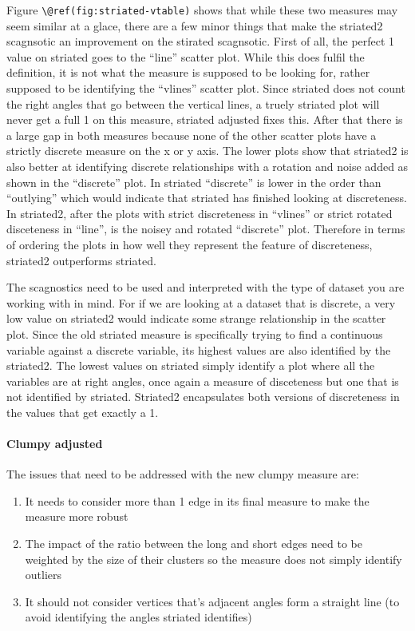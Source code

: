 Figure \texttt{\textbackslash{}@ref(fig:striated-vtable)} shows that
while these two measures may seem similar at a glace, there are a few
minor things that make the striated2 scagnsotic an improvement on the
stirated scagnsotic. First of all, the perfect 1 value on striated goes
to the ``line'' scatter plot. While this does fulfil the definition, it
is not what the measure is supposed to be looking for, rather supposed
to be identifying the ``vlines'' scatter plot. Since striated does not
count the right angles that go between the vertical lines, a truely
striated plot will never get a full 1 on this measure, striated adjusted
fixes this. After that there is a large gap in both measures because
none of the other scatter plots have a strictly discrete measure on the
x or y axis. The lower plots show that striated2 is also better at
identifying discrete relationships with a rotation and noise added as
shown in the ``discrete'' plot. In striated ``discrete'' is lower in the
order than ``outlying'' which would indicate that striated has finished
looking at discreteness. In striated2, after the plots with strict
discreteness in ``vlines'' or strict rotated disceteness in ``line'', is
the noisey and rotated ``discrete'' plot. Therefore in terms of ordering
the plots in how well they represent the feature of discreteness,
striated2 outperforms striated.

The scagnostics need to be used and interpreted with the type of dataset
you are working with in mind. For if we are looking at a dataset that is
discrete, a very low value on striated2 would indicate some strange
relationship in the scatter plot. Since the old striated measure is
specifically trying to find a continuous variable against a discrete
variable, its highest values are also identified by the striated2. The
lowest values on striated simply identify a plot where all the variables
are at right angles, once again a measure of disceteness but one that is
not identified by striated. Striated2 encapsulates both versions of
discreteness in the values that get exactly a 1.

\hypertarget{clumpy-adjusted}{%
\paragraph{Clumpy adjusted}\label{clumpy-adjusted}}

The issues that need to be addressed with the new clumpy measure are:

\begin{enumerate}
\def\labelenumi{\arabic{enumi}.}
\tightlist
\item
  It needs to consider more than 1 edge in its final measure to make the
  measure more robust
\item
  The impact of the ratio between the long and short edges need to be
  weighted by the size of their clusters so the measure does not simply
  identify outliers
\item
  It should not consider vertices that's adjacent angles form a straight
  line (to avoid identifying the angles striated identifies)
\end{enumerate}

